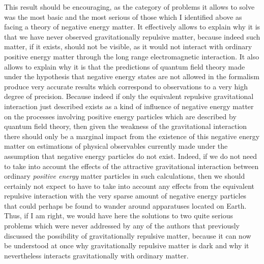 \documentclass[notitlepage,12pt]{report}
\begin{document}
This result should be encouraging, as the category of problems it allows to solve was the most basic and the most serious of those which I identified above as facing a theory of negative energy matter. It effectively allows to explain why it is that we have never observed gravitationally repulsive matter, because indeed such matter, if it exists, should not be visible, as it would not interact with ordinary positive energy matter through the long range electromagnetic interaction. It also allows to explain why it is that the predictions of quantum field theory made under the hypothesis that negative energy states are not allowed in the formalism produce very accurate results which correspond to observations to a very high degree of precision. Because indeed if only the equivalent repulsive gravitational interaction just described exists as a kind of influence of negative energy matter on the processes involving positive energy particles which are described by quantum field theory, then given the weakness of the gravitational interaction there should only be a marginal impact from the existence of this negative energy matter on estimations of physical observables currently made under the assumption that negative energy particles do not exist. Indeed, if we do not need to take into account the effects of the attractive gravitational interaction between ordinary \textit{positive energy} matter particles in such calculations, then we should certainly not expect to have to take into account any effects from the equivalent repulsive interaction with the very sparse amount of negative energy particles that could perhaps be found to wander around apparatuses located on Earth. Thus, if I am right, we would have here the solutions to two quite serious problems which were never addressed by any of the authors that previously discussed the possibility of gravitationally repulsive matter, because it can now be understood at once why gravitationally repulsive matter is dark and why it nevertheless interacts gravitationally with ordinary matter.
\end{document}
